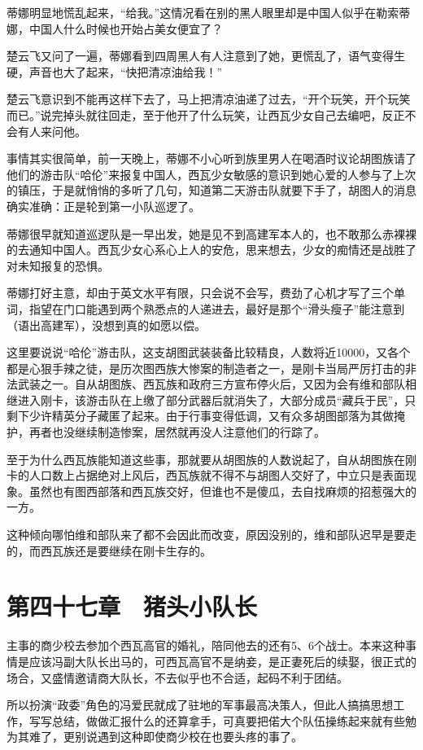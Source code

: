 蒂娜明显地慌乱起来，“给我。”这情况看在别的黑人眼里却是中国人似乎在勒索蒂娜，中国人什么时候也开始占美女便宜了？

楚云飞又问了一遍，蒂娜看到四周黑人有人注意到了她，更慌乱了，语气变得生硬，声音也大了起来，“快把清凉油给我！”

楚云飞意识到不能再这样下去了，马上把清凉油递了过去，“开个玩笑，开个玩笑而已。”说完掉头就往回走，至于他开了什么玩笑，让西瓦少女自己去编吧，反正不会有人来问他。

事情其实很简单，前一天晚上，蒂娜不小心听到族里男人在喝酒时议论胡图族请了他们的游击队“哈伦”来报复中国人，西瓦少女敏感的意识到她心爱的人参与了上次的镇压，于是就悄悄的多听了几句，知道第二天游击队就要下手了，胡图人的消息确实准确：正是轮到第一小队巡逻了。

蒂娜很早就知道巡逻队是一早出发，她是见不到高建军本人的，也不敢那么赤裸裸的去通知中国人。西瓦少女心系心上人的安危，思来想去，少女的痴情还是战胜了对未知报复的恐惧。

蒂娜打好主意，却由于英文水平有限，只会说不会写，费劲了心机才写了三个单词，指望在门口能遇到两个熟悉点的人递进去，最好是那个“滑头瘦子”能注意到（语出高建军），没想到真的如愿以偿。

这里要说说“哈伦”游击队，这支胡图武装装备比较精良，人数将近10000，又各个都是心狠手辣之徒，是历次图西族大惨案的制造者之一，是刚卡当局严厉打击的非法武装之一。自从胡图族、西瓦族和政府三方宣布停火后，又因为会有维和部队相继进入刚卡，该游击队在上缴了部分武器后就消失了，大部分成员“藏兵于民”，只剩下少许精英分子藏匿了起来。由于行事变得低调，又有众多胡图部落为其做掩护，再者也没继续制造惨案，居然就再没人注意他们的行踪了。

至于为什么西瓦族能知道这些事，那就要从胡图族的人数说起了，自从胡图族在刚卡的人口数上占据绝对上风后，西瓦族就不得不与胡图人交好了，中立只是表面现象。虽然也有图西部落和西瓦族交好，但谁也不是傻瓜，去自找麻烦的招惹强大的一方。

这种倾向哪怕维和部队来了都不会因此而改变，原因没别的，维和部队迟早是要走的，而西瓦族还是要继续在刚卡生存的。

\section{第四十七章　猪头小队长}

主事的商少校去参加个西瓦高官的婚礼，陪同他去的还有5、6个战士。本来这种事情是应该冯副大队长出马的，可西瓦高官不是纳妾，是正妻死后的续娶，很正式的场合，又盛情邀请商大队长，不去似乎也不合适，起码不利于团结。

所以扮演“政委”角色的冯爱民就成了驻地的军事最高决策人，但此人搞搞思想工作，写写总结，做做汇报什么的还算拿手，可真要把偌大个队伍操练起来就有些勉为其难了，更别说遇到这种即使商少校在也要头疼的事了。

